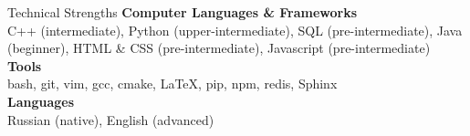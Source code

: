 \documentclass{resume}
\begin{document}
\begin{rSection}{Technical Strengths}
    {\bf Computer Languages \& Frameworks}\\ 
        C++ (intermediate), Python (upper-intermediate), SQL (pre-intermediate), 
        Java (beginner), HTML \& CSS (pre-intermediate), Javascript (pre-intermediate) \\
    {\bf Tools} \\ 
        bash, git, vim, gcc, cmake, LaTeX, pip, npm, redis, Sphinx \\
    {\bf Languages} \\ 
        Russian (native), English (advanced)
\end{rSection}
\end{document}
